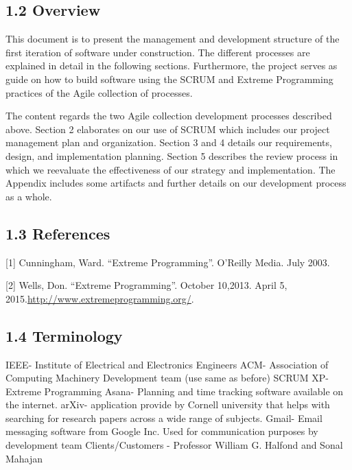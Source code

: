 \documentclass[]{article}
\begin{document}
\subsection{1.2 Overview}\label{overview}

This document is to present the management and development structure of
the first iteration of software under construction. The different
processes are explained in detail in the following sections.
Furthermore, the project serves as guide on how to build software using
the SCRUM and Extreme Programming practices of the Agile collection of
processes.

The content regards the two Agile collection development processes
described above. Section 2 elaborates on our use of SCRUM which includes
our project management plan and organization. Section 3 and 4 details
our requirements, design, and implementation planning. Section 5
describes the review process in which we reevaluate the effectiveness of
our strategy and implementation. The Appendix includes some artifacts
and further details on our development process as a whole.

\subsection{1.3 References}\label{references}

{[}1{]} Cunningham, Ward. ``Extreme Programming''. O'Reilly Media. July
2003.

{[}2{]} Wells, Don. ``Extreme Programming''. October 10,2013. April 5,
2015.\url{http://www.extremeprogramming.org/}.

\subsection{1.4 Terminology}\label{terminology}

IEEE- Institute of Electrical and Electronics Engineers ACM- Association
of Computing Machinery Development team (use same as before) SCRUM XP-
Extreme Programming Asana- Planning and time tracking software available
on the internet. arXiv- application provide by Cornell university that
helps with searching for research papers across a wide range of
subjects. Gmail- Email messaging software from Google Inc. Used for
communication purposes by development team Clients/Customers - Professor
William G. Halfond and Sonal Mahajan
\end{document}
